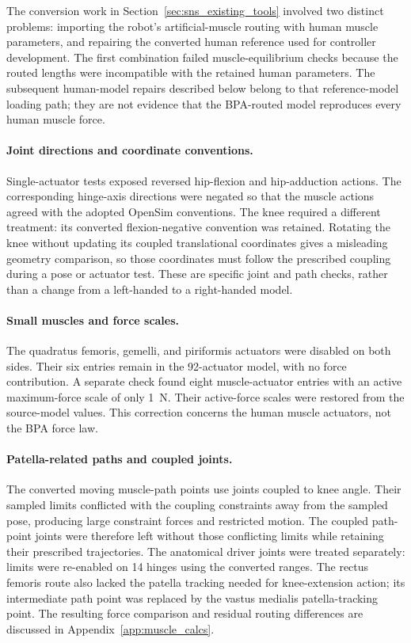 \documentclass[11pt]{report}
\begin{document}
The conversion work in Section~\ref{sec:sns_existing_tools} involved two distinct problems: importing the robot's artificial-muscle routing with human muscle parameters, and repairing the converted human reference used for controller development. The first combination failed muscle-equilibrium checks because the routed lengths were incompatible with the retained human parameters. The subsequent human-model repairs described below belong to that reference-model loading path; they are not evidence that the BPA-routed model reproduces every human muscle force.

\paragraph{Joint directions and coordinate conventions.}
Single-actuator tests exposed reversed hip-flexion and hip-adduction actions. The corresponding hinge-axis directions were negated so that the muscle actions agreed with the adopted OpenSim conventions. The knee required a different treatment: its converted flexion-negative convention was retained. Rotating the knee without updating its coupled translational coordinates gives a misleading geometry comparison, so those coordinates must follow the prescribed coupling during a pose or actuator test. These are specific joint and path checks, rather than a change from a left-handed to a right-handed model.

\paragraph{Small muscles and force scales.}
The quadratus femoris, gemelli, and piriformis actuators were disabled on both sides. Their six entries remain in the 92-actuator model, with no force contribution. A separate check found eight muscle-actuator entries with an active maximum-force scale of only \qty{1}{\newton}. Their active-force scales were restored from the source-model values. This correction concerns the human muscle actuators, not the BPA force law.

\paragraph{Patella-related paths and coupled joints.}
The converted moving muscle-path points use joints coupled to knee angle. Their sampled limits conflicted with the coupling constraints away from the sampled pose, producing large constraint forces and restricted motion. The coupled path-point joints were therefore left without those conflicting limits while retaining their prescribed trajectories. The anatomical driver joints were treated separately: limits were re-enabled on 14 hinges using the converted ranges. The rectus femoris route also lacked the patella tracking needed for knee-extension action; its intermediate path point was replaced by the vastus medialis patella-tracking point. The resulting force comparison and residual routing differences are discussed in Appendix~\ref{app:muscle_calcs}.
\end{document}
